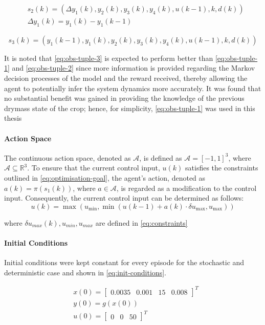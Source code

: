 \begin{equation}\label{eq:obs-tuple-2}
\begin{aligned}
    & s_2(k) = (\Delta y_1(k),y_2(k),y_3(k),y_4(k), u(k-1), k, d(k)) \\
    & \Delta y_1(k) = y_1(k) - y_1(k-1)
\end{aligned}
\end{equation}


\begin{equation}\label{eq:obs-tuple-3}
    s_3(k) = (y_1(k-1),y_1(k),y_2(k),y_3(k),y_4(k), u(k-1), k, d(k))
\end{equation}

It is noted that \autoref{eq:obs-tuple-3} is expected to perform better than \autoref{eq:obs-tuple-1} and \autoref{eq:obs-tuple-2} since more information is provided regarding the Markov decision processes of the model and the reward received, thereby allowing the agent to potentially infer the system dynamics more accurately. It was found that no substantial benefit was gained in providing the knowledge of the previous drymass state of the crop; hence, for simplicity, \autoref{eq:obs-tuple-1} was used in this thesis

\paragraph{Action Space}
The continuous action space, denoted as \( \mathcal{A} \), is defined as \( \mathcal{A} = [-1, 1]^3 \), where \( \mathcal{A} \subseteq \mathbb{R}^3 \). To ensure that the current control input, $u(k)$ satisfies the constraints outlined in \autoref{eq:optimisation-goal}, the agent’s action, denoted as  $a(k) = \pi (s_1(k))$, where $a \in \mathcal{A}$, is regarded as a modification to the control input. Consequently, the current control input can be determined as follows:
$$
u(k) = \max(u_{\min}, \min(u(k-1) + a(k) \cdot \delta u_{\max}, u_{\max}))
$$

where $\delta u_{max}(k),u_{min}, u_{max}$ are defined in \autoref{eq:constraints}

\paragraph{Initial Conditions}
Initial conditions were kept constant for every episode for the stochastic and deterministic case and shown in \autoref{eq:init-conditions}.

\begin{equation}
    \label{eq:init-conditions}
    \begin{aligned}
        &x(0) = \begin{bmatrix}
            0.0035&0.001&15&0.008
        \end{bmatrix}^T \\
        &y(0) = g(x(0)) \\
        &u(0) = \begin{bmatrix}
            0 & 0 & 50
        \end{bmatrix}^T
    \end{aligned}
\end{equation}

